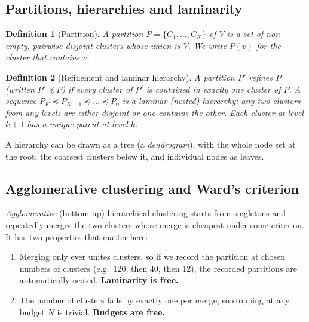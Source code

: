 \documentclass[11pt,a4paper]{article}
\newtheorem{definition}{Definition}[section]
\theoremstyle{remark}
\begin{document}
\subsection{Partitions, hierarchies and laminarity}

\begin{definition}[Partition]
A \emph{partition} $P=\{C_1,\dots,C_K\}$ of $V$ is a set of non-empty, pairwise
disjoint \emph{clusters} whose union is $V$. We write $P(v)$ for the cluster that
contains $v$.
\end{definition}

\begin{definition}[Refinement and laminar hierarchy]
A partition $P'$ \emph{refines} $P$ (written $P'\preceq P$) if every cluster of $P'$
is contained in exactly one cluster of $P$. A sequence
$P_K\preceq P_{K-1}\preceq\dots\preceq P_0$ is a \emph{laminar} (nested) hierarchy:
any two clusters from any levels are either disjoint or one contains the other.
Each cluster at level $k+1$ has a unique parent at level $k$.
\end{definition}

A hierarchy can be drawn as a tree (a \emph{dendrogram}), with the whole node set at
the root, the coarsest clusters below it, and individual nodes as leaves.

\subsection{Agglomerative clustering and Ward's criterion}

\emph{Agglomerative} (bottom-up) hierarchical clustering starts from singletons and
repeatedly merges the two clusters whose merge is cheapest under some criterion. It
has two properties that matter here:

\begin{enumerate}
  \item Merging only ever unites clusters, so if we record the partition at chosen
        numbers of clusters (e.g.\ 120, then 40, then 12), the recorded partitions
        are automatically nested. \textbf{Laminarity is free.}
  \item The number of clusters falls by exactly one per merge, so stopping at any
        budget $N$ is trivial. \textbf{Budgets are free.}
\end{enumerate}
\end{document}
